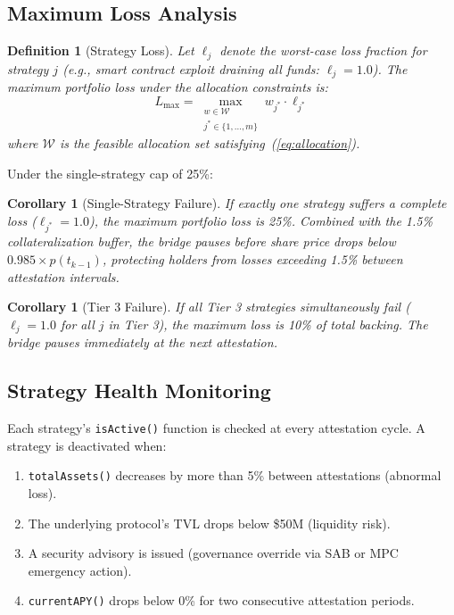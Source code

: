\documentclass[11pt,twocolumn]{article}
\newtheorem{corollary}[theorem]{Corollary}
\newtheorem{definition}{Definition}[section]
\begin{document}
\subsection{Maximum Loss Analysis}

\begin{definition}[Strategy Loss]
Let $\ell_j$ denote the worst-case loss fraction for strategy $j$ (e.g., smart contract exploit draining all funds: $\ell_j = 1.0$). The maximum portfolio loss under the allocation constraints is:
\begin{equation}\label{eq:maxloss}
  L_{\max} = \max_{\substack{w \in \mathcal{W} \\ j^* \in \{1,\ldots,m\}}} w_{j^*} \cdot \ell_{j^*}
\end{equation}
where $\mathcal{W}$ is the feasible allocation set satisfying~(\ref{eq:allocation}).
\end{definition}

Under the single-strategy cap of 25\%:

\begin{corollary}[Single-Strategy Failure]
If exactly one strategy suffers a complete loss ($\ell_{j^*} = 1.0$), the maximum portfolio loss is 25\%. Combined with the 1.5\% collateralization buffer, the bridge pauses before share price drops below $0.985 \times p(t_{k-1})$, protecting holders from losses exceeding 1.5\% between attestation intervals.
\end{corollary}

\begin{corollary}[Tier 3 Failure]
If all Tier 3 strategies simultaneously fail ($\ell_j = 1.0$ for all $j$ in Tier 3), the maximum loss is 10\% of total backing. The bridge pauses immediately at the next attestation.
\end{corollary}

\subsection{Strategy Health Monitoring}

Each strategy's \texttt{isActive()} function is checked at every attestation cycle. A strategy is deactivated when:
\begin{enumerate}[nosep]
  \item \texttt{totalAssets()} decreases by more than 5\% between attestations (abnormal loss).
  \item The underlying protocol's TVL drops below \$50M (liquidity risk).
  \item A security advisory is issued (governance override via SAB or MPC emergency action).
  \item \texttt{currentAPY()} drops below 0\% for two consecutive attestation periods.
\end{enumerate}
\end{document}
